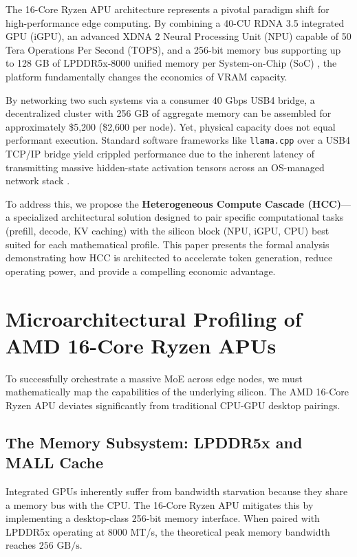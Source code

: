 \documentclass[11pt,a4paper]{article}
\begin{document}
The 16-Core Ryzen APU architecture represents a pivotal paradigm shift for high-performance edge computing. By combining a 40-CU RDNA 3.5 integrated GPU (iGPU), an advanced XDNA 2 Neural Processing Unit (NPU) capable of 50 Tera Operations Per Second (TOPS), and a 256-bit memory bus supporting up to 128 GB of LPDDR5x-8000 unified memory per System-on-Chip (SoC) \cite{ryzen16core}, the platform fundamentally changes the economics of VRAM capacity.

By networking two such systems via a consumer 40 Gbps USB4 bridge, a decentralized cluster with 256 GB of aggregate memory can be assembled for approximately \$5,200 (\$2,600 per node). Yet, physical capacity does not equal performant execution. Standard software frameworks like \texttt{llama.cpp} over a USB4 TCP/IP bridge yield crippled performance due to the inherent latency of transmitting massive hidden-state activation tensors across an OS-managed network stack \cite{geerling2025, llama_rpc}.

To address this, we propose the \textbf{Heterogeneous Compute Cascade (HCC)}---a specialized architectural solution designed to pair specific computational tasks (prefill, decode, KV caching) with the silicon block (NPU, iGPU, CPU) best suited for each mathematical profile. This paper presents the formal analysis demonstrating how HCC is architected to accelerate token generation, reduce operating power, and provide a compelling economic advantage.

\section{Microarchitectural Profiling of AMD 16-Core Ryzen APUs}

To successfully orchestrate a massive MoE across edge nodes, we must mathematically map the capabilities of the underlying silicon. The AMD 16-Core Ryzen APU deviates significantly from traditional CPU-GPU desktop pairings.

\subsection{The Memory Subsystem: LPDDR5x and MALL Cache}
Integrated GPUs inherently suffer from bandwidth starvation because they share a memory bus with the CPU. The 16-Core Ryzen APU mitigates this by implementing a desktop-class 256-bit memory interface. When paired with LPDDR5x operating at 8000 MT/s, the theoretical peak memory bandwidth reaches $256 \text{ GB/s}$.
\end{document}
